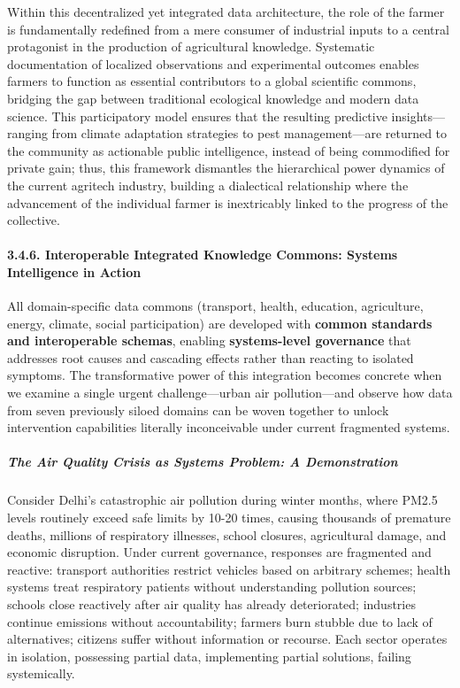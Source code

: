 Within this decentralized yet integrated data architecture, the role of
the farmer is fundamentally redefined from a mere consumer of industrial
inputs to a central protagonist in the production of agricultural
knowledge. Systematic documentation of localized observations and
experimental outcomes enables farmers to function as essential
contributors to a global scientific commons, bridging the gap between
traditional ecological knowledge and modern data science. This
participatory model ensures that the resulting predictive
insights---ranging from climate adaptation strategies to pest
management---are returned to the community as actionable public
intelligence, instead of being commodified for private gain; thus, this
framework dismantles the hierarchical power dynamics of the current
agritech industry, building a dialectical relationship where the
advancement of the individual farmer is inextricably linked to the
progress of the collective.

\paragraph{3.4.6. Interoperable Integrated Knowledge Commons: Systems
Intelligence in
Action}\label{interoperable-integrated-knowledge-commons-systems-intelligence-in-action}

All domain-specific data commons (transport, health, education,
agriculture, energy, climate, social participation) are developed with
\textbf{common standards and interoperable schemas}, enabling
\textbf{systems-level governance} that addresses root causes and
cascading effects rather than reacting to isolated symptoms. The
transformative power of this integration becomes concrete when we
examine a single urgent challenge---urban air pollution---and observe
how data from seven previously siloed domains can be woven together to
unlock intervention capabilities literally inconceivable under current
fragmented systems.

\subparagraph{The Air Quality Crisis as Systems Problem: A
Demonstration}\label{the-air-quality-crisis-as-systems-problem-a-demonstration}

Consider Delhi's catastrophic air pollution during winter months, where
PM2.5 levels routinely exceed safe limits by 10-20 times, causing
thousands of premature deaths, millions of respiratory illnesses, school
closures, agricultural damage, and economic disruption. Under current
governance, responses are fragmented and reactive: transport authorities
restrict vehicles based on arbitrary schemes; health systems treat
respiratory patients without understanding pollution sources; schools
close reactively after air quality has already deteriorated; industries
continue emissions without accountability; farmers burn stubble due to
lack of alternatives; citizens suffer without information or recourse.
Each sector operates in isolation, possessing partial data, implementing
partial solutions, failing systemically.

